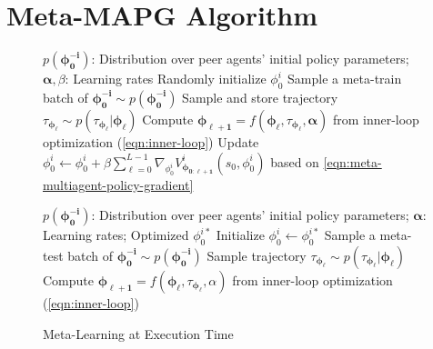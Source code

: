 \section{Meta-MAPG Algorithm}\label{sec:meta-mapg-algorithm}
\vspace{-0.5cm}
\begin{figure}[H]
\begin{minipage}[t]{0.49\textwidth}
\begin{algorithm}[H]
	\caption{Meta-Learning at Training Time}\label{alg:meta-train}  
	\small
	\begin{algorithmic}[1]
	    \REQUIRE $p(\bm{\phi}^{\bm{-i}}_{\bm{0}})$: Distribution over peer agents' initial policy parameters; $\bm{\alpha},\beta$: Learning rates 
	    \STATE Randomly initialize $\phi^{i}_{0}$
		    \STATE Sample a meta-train batch of $\bm{\phi}^{\bm{-i}}_{\bm{0}}\sim p(\bm{\phi}^{\bm{-i}}_{\bm{0}})$
		            \STATE Sample and store trajectory $\tau_{\bm{\phi}_{\bm{\ell}}}\sim p(\tau_{\bm{\phi}_{\bm{\ell}}}|\bm{\phi}_{\bm{\ell}})$
		            \STATE Compute $\bm{\phi}_{\bm{\ell+1}}=f(\bm{\phi}_{\bm{\ell}},\tau_{\bm{\phi}_{\bm{\ell}}},\bm{\alpha})$ from
		            inner-loop optimization (\cref{eqn:inner-loop})
		        \ENDFOR
		    \ENDFOR
		    \STATE Update $\phi^{i}_{0}\leftarrow\phi^{i}_{0}+\beta\sum_{\ell=0}^{L-1}\nabla_{\phi^{i}_{0}}V^{i}_{\bm{\phi}_{\bm{0:\ell+1}}}(s_0,\phi^{i}_{0})$ based on \cref{eqn:meta-multiagent-policy-gradient}
		\ENDWHILE
	\end{algorithmic}
\end{algorithm}
\end{minipage}
\hfill
\begin{minipage}[t]{0.49\textwidth}
\begin{algorithm}[H]
	\caption{Meta-Learning at Execution Time}\label{alg:meta-test}  
	\small
	\begin{algorithmic}[1]
	    \REQUIRE $p(\bm{\phi}^{\bm{-i}}_{\bm{0}})$: Distribution over peer agents' initial policy parameters; $\bm{\alpha}$: Learning rates; Optimized $\phi^{i*}_{0}$
	    \STATE Initialize $\phi^{i}_{0}\leftarrow\phi^{i*}_{0}$
		\STATE Sample a meta-test batch of $\bm{\phi}^{\bm{-i}}_{\bm{0}}\sim p(\bm{\phi}^{\bm{-i}}_{\bm{0}})$
		      \STATE Sample trajectory $\tau_{\bm{\phi}_{\bm{\ell}}}\sim p(\tau_{\bm{\phi}_{\bm{\ell}}}|\bm{\phi}_{\bm{\ell}})$
		      \STATE Compute $\bm{\phi}_{\bm{\ell+1}}=f(\bm{\phi}_{\bm{\ell}},\tau_{\bm{\phi}_{\bm{\ell}}},\alpha)$ from inner-loop optimization (\cref{eqn:inner-loop})
		  \ENDFOR
		\ENDFOR
	\end{algorithmic}
\end{algorithm}
\end{minipage}
\end{figure}
\vspace{-0.5cm}

